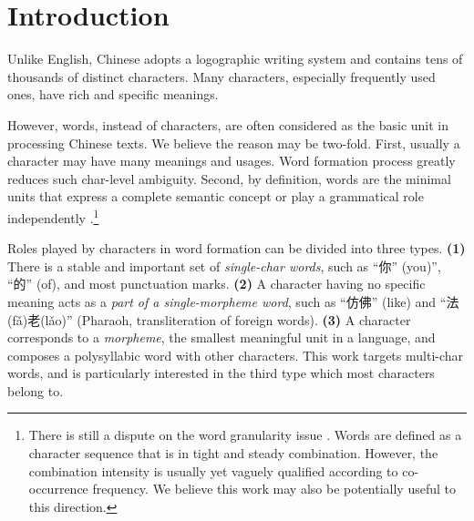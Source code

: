 \section{Introduction}\label{sec:intro}







Unlike English, 
Chinese adopts a logographic writing system and contains tens of thousands of distinct characters. 
Many characters, especially frequently used ones, have rich and specific meanings. %

However, words, instead of characters, are often considered as the basic unit in processing Chinese texts. We believe the reason may be two-fold. First, usually a character may have many meanings and usages. Word formation process greatly reduces such char-level ambiguity. Second, by definition, words are the minimal units that express a complete semantic concept or play a grammatical role independently \cite{ctb-xiafei,yu2003ppd}.\footnote{There 
is still a dispute on the word granularity issue \cite{gong-2017-multi,naacl21-latticebert}. Words are defined as a character sequence that is in tight and steady combination. However, the combination intensity is usually yet vaguely qualified according to co-occurrence frequency. We believe this work may also be potentially useful to %
this direction.
}

Roles played by characters in word formation can be divided into three types. 
\textbf{\footnotesize{(1)}} There is a stable and important set of 
\emph{single-char words}, such as ``你'' (you)'', ``的'' (of), and most punctuation marks. 
\textbf{\footnotesize{(2)}} A character having no specific meaning acts as a \emph{part of a single-morpheme word}, such as ``仿佛'' (like) and %
``法(f\v{a})老(l\v{a}o)'' (Pharaoh, 
transliteration of foreign words). 
\textbf{\footnotesize{(3)}} A character corresponds to a \emph{morpheme}, the smallest meaningful unit in a language, and composes a polysyllabic word with other characters. This work  targets multi-char words, and  is particularly interested in the third type which most characters belong to. 

